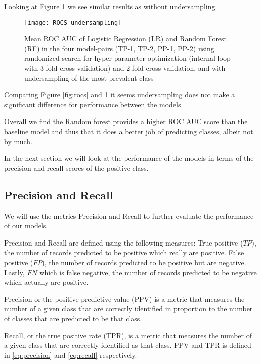 Looking at Figure \ref{fig:rocs_undersampling} we see similar results as without undersampling.

\begin{figure}[H]
    \hspace*{-1.0cm}
    \centering
    \texttt{[image: ROCS\_undersampling]}
    \caption{Mean ROC AUC of Logistic Regression (LR) and Random Forest (RF) in the four model-pairs (TP-1, TP-2, PP-1, PP-2) using randomized search for hyper-parameter optimization (internal loop with 3-fold cross-validation) and 2-fold cross-validation, and with undersampling of the most prevalent class}
    \label{fig:rocs_undersampling}
\end{figure}

Comparing Figure \ref{fig:rocs} and \ref{fig:rocs_undersampling} it seems undersampling does not make a significant difference for performance between the models.

Overall we find the Random forest provides a higher ROC AUC score than the baseline model and thus that it does a better job of predicting classes, albeit not by much.

In the next section we will look at the performance of the models in terms of the precision and recall scores of the positive class.  

\subsection{Precision and Recall}
We will use the metrics Precision and Recall to further evaluate the performance of our models.

Precision and Recall are defined using the following measures: True positive ($TP$), the number of records predicted to be positive which really are positive. False positive ($FP$), the number of records predicted to be positive but are negative. Lastly, $FN$ which is false negative, the number of records predicted to be negative which actually are positive.

Precision or the positive predictive value (PPV) is a metric that measures the number of a given class that are correctly identified in proportion to the number of classes that are predicted to be that class.

Recall, or the true positive rate (TPR), is a metric that measures the number of a given class that are correctly identified as that class. PPV and TPR is defined in \autoref{eq:precision} and \autoref{eq:recall} respectively.

